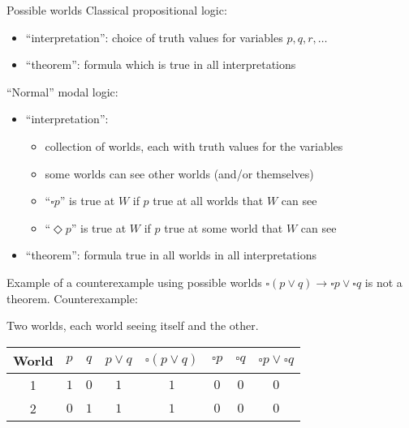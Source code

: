 \documentclass{beamer}
\newcommand{\nec}{\square}
\newcommand{\poss}{\Diamond}
\begin{document}
\begin{frame}{Possible worlds}
Classical propositional logic:
\begin{itemize}
\item ``interpretation'': choice of truth values for variables $p,q,r,\dotsc$
\item ``theorem'': formula which is true in all interpretations
\end{itemize}
\vfill
``Normal'' modal logic:
\begin{itemize}
\item ``interpretation'':
    \begin{itemize}
    \item collection of worlds, each with truth values for the variables
    \item some worlds can see other worlds (and/or themselves)
    \item ``$\nec p$'' is true at $W$ if $p$ true at all worlds that $W$ can see
    \item ``$\poss p$'' is true at $W$ if $p$ true at some world that $W$ can see
    \end{itemize}
\item ``theorem'': formula true in all worlds in all interpretations
\end{itemize}
\end{frame}

\begin{frame}{Example of a counterexample using possible worlds}
$\nec(p\lor q)\to\nec p\lor\nec q$ is not a theorem.
\vfill
Counterexample:

\addvspace{\baselineskip}
Two worlds, each world seeing itself and the other.

\addvspace{\baselineskip}
\begin{tabular}{c|cc|cc|ccc}
World & $p$ & $q$ & $p\lor q$ & $\nec (p\lor q)$ & $\nec p$ & $\nec q$ & $\nec p\lor\nec q$ \\
\hline
1 & $1$ & $0$ & $1$ & $1$ & $0$ & $0$ & $0$ \\
2 & $0$ & $1$ & $1$ & $1$ & $0$ & $0$ & $0$ \\
\end{tabular}
\end{frame}
\end{document}
